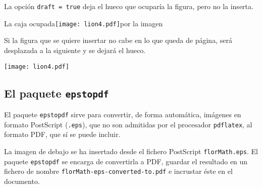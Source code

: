 \documentclass[11pt, a4paper]{article}
\begin{document}
\bigskip
La opción \texttt{draft = true} deja el hueco que ocuparía la figura,
pero no la inserta.
%



\begin{center}
La caja ocupada\texttt{[image: lion4.pdf]}por la imagen
\end{center}



\bigskip
Si la figura que se quiere insertar no cabe en lo que queda de página, será desplazada a la siguiente y se dejará el hueco. 

\begin{center}
\texttt{[image: lion4.pdf]}
\end{center}





\subsection{El paquete \texttt{epstopdf}}





El paquete \texttt{epstopdf} sirve para convertir, de forma automática, imágenes en formato PostScript (\texttt{.eps}), que no son admitidas por el procesador \texttt{pdflatex}, al formato PDF, que sí se puede incluir.





\bigskip
La imagen de debajo se ha insertado desde el fichero PostScript \texttt{florMath.eps}.
El paquete \texttt{epstopdf} se encarga de convertirla a PDF, guardar el resultado en un fichero de nombre  \texttt{florMath-eps-converted-to.pdf} e incrustar éste en el documento. 
\end{document}
